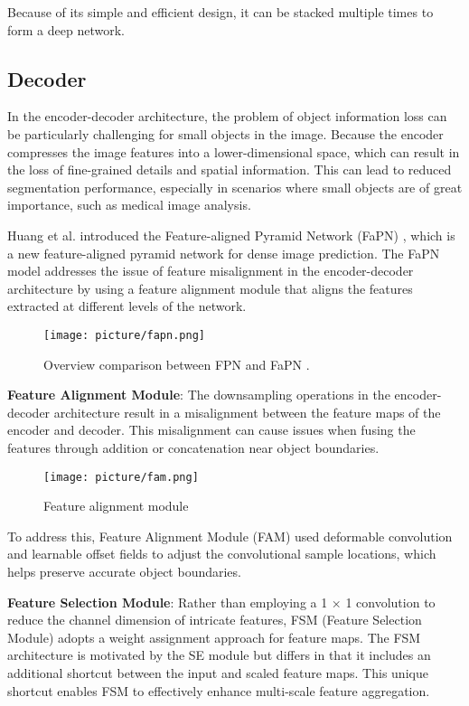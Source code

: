 \documentclass{article}
\begin{document}
Because of its simple and efficient design, it can be stacked multiple times to form a deep network.


\subsection{Decoder}


In the encoder-decoder architecture, the problem of object information loss can be particularly challenging for small objects in the image. Because the encoder compresses the image features into a lower-dimensional space, which can result in the loss of fine-grained details and spatial information. This can lead to reduced segmentation performance, especially in scenarios where small objects are of great importance, such as medical image analysis.

Huang et al. introduced the Feature-aligned Pyramid Network (FaPN) \cite{FaPN}, which is a new feature-aligned pyramid network for dense image prediction. The FaPN model addresses the issue of feature misalignment in the encoder-decoder architecture by using a feature alignment module that aligns the features extracted at different levels of the network.

\begin{figure*}[ht!]
\centerline{\texttt{[image: picture/fapn.png]}}
\caption{Overview comparison between FPN and FaPN \cite{FaPN}.}
\label{fig:fpn-vs-fapn}
\end{figure*}

\textbf{Feature Alignment Module}: The downsampling operations in the encoder-decoder architecture result in a misalignment between the feature maps of the encoder and decoder. This misalignment can cause issues when fusing the features through addition or concatenation near object boundaries. 

\begin{figure*}[ht!]
\centerline{\texttt{[image: picture/fam.png]}}
\caption{Feature alignment module \cite{FaPN}}
\label{fig:fam}
\end{figure*}

To address this, Feature Alignment Module (FAM) used deformable convolution and learnable offset fields to adjust the convolutional sample locations, which helps preserve accurate object boundaries. 


\textbf{Feature Selection Module}: Rather than employing a 1 × 1 convolution to reduce the channel dimension of intricate features, FSM (Feature Selection Module) adopts a weight assignment approach for feature maps. The FSM architecture is motivated by the SE module but differs in that it includes an additional shortcut between the input and scaled feature maps. This unique shortcut enables FSM to effectively enhance multi-scale feature aggregation. 
\end{document}
